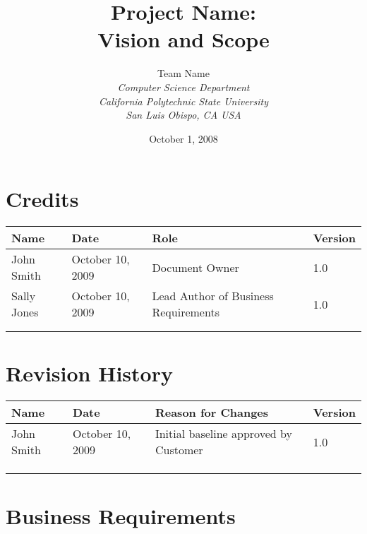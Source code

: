 \documentclass[12pt,oneside,letterpaper]{article}
\begin{document}
\title{\bfseries Project Name: \\Vision and Scope}

\author {
\large{Team Name}\\
\emph{Computer Science Department}\\
\emph{California Polytechnic State University}\\
\emph{San Luis Obispo, CA USA}\\
}

\date{October 1, 2008}
\maketitle \thispagestyle{empty}

\pagebreak
\tableofcontents


\section*{Credits}
\begin{tabular}{|l|l|p{2in}|l|}
\hline
\textbf{Name}&\textbf{Date}&\textbf{Role}&\textbf{Version}\\
\hline
John Smith&October 10, 2009&Document Owner&1.0\\
\hline
Sally Jones&October 10, 2009&Lead Author of Business Requirements&1.0\\
\hline
&&&\\
\hline
&&&\\
\hline
\end{tabular}


\section*{Revision History}
\begin{tabular}{|l|l|p{2in}|l|}
\hline
\textbf{Name}&\textbf{Date}&\textbf{Reason for Changes}&\textbf{Version}\\
\hline
John Smith&October 10, 2009&Initial baseline approved by Customer&1.0\\
\hline
&&&\\
\hline
&&&\\
\hline
&&&\\
\hline
\end{tabular}


\newpage

\section{Business Requirements}
\end{document}
